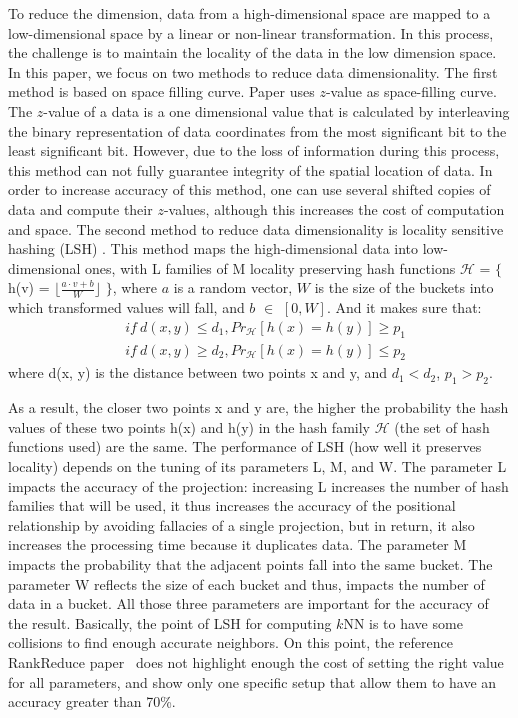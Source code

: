 \documentclass[10pt,journal,compsoc]{IEEEtran}
\begin{document}
To reduce the dimension, data from a high-dimensional space are mapped to a low-dimensional space by a linear or 
non-linear transformation. In 
this process, the challenge is to maintain the locality of the data in the low dimension space. In this paper, we focus 
on two methods to reduce 
data dimensionality.
The first method is based on space filling curve. Paper \cite{Zhang:2012:EPK:2247596.2247602} uses $z$-value as space-filling curve. The 
$z$-value of a data is a one dimensional value that is calculated by interleaving the binary representation of data coordinates from the most 
significant bit to the least significant bit. 
However, due to the loss of information during this process, this method can not fully guarantee integrity of the spatial location of data. 
In order to increase accuracy of this method, one can use several shifted copies of data and compute their $z$-values, although this increases the cost of computation and space. 
The second method to reduce data dimensionality is locality sensitive hashing (LSH) \cite{DBLP:conf/compgeom/2004,Datar:2004:LHS:997817.997857}. This method maps the high-dimensional data into low-dimensional ones, with L families of M locality preserving hash functions $\mathcal{H}$ = $\lbrace$ h(v) =  $\lfloor \frac{a \cdot v + b}{W}\rfloor$ $\rbrace$, where $a$ is a random vector, $W$ is the size of the buckets into which transformed values will fall, and 
$b$ $\in$ $\left[0, W\right]$. 
And it makes sure that:
\begin{eqnarray}
& if \  d(x, y) \leq d_1, Pr_\mathcal{H}\left[h(x)=h(y)\right] \geq p_1 \\
& if \  d(x, y) \geq d_2, Pr_\mathcal{H}\left[h(x)=h(y)\right] \leq p_2
\end{eqnarray}
where d(x, y) is the distance between two points x and y, and $d_1 < d_2$, $p_1 > p_2$. 


 As a result, the closer two points x and y are, the higher the probability the hash values of these two points h(x) and h(y) in the hash family $\mathcal{H}$ (the set of hash functions used) are the same. 
The performance of LSH (how well it preserves locality) depends on the tuning of its parameters L, M, and W. The 
parameter L impacts the accuracy of the projection: increasing L increases the number of hash families that will be used, it thus increases the accuracy of the positional 
relationship by avoiding fallacies of a single projection, but in return, it also increases the processing time 
because it duplicates data.
The parameter M impacts the probability that the adjacent points fall into the same bucket. The parameter W 
reflects the size of each bucket and thus, impacts the number of data in a bucket.
All those three parameters are important for the accuracy of the result. Basically, the point of LSH for computing $k$NN is to have some collisions to find enough accurate neighbors. On this point, the reference RankReduce paper~\cite{Stupar10rankreduce-} does not highlight enough the cost of setting the right value for all parameters, and show only one specific setup that allow them to have an accuracy greater than 70\%. 
\end{document}
